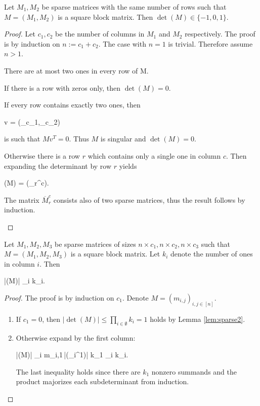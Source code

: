 \begin{lem}
\label{lem:sparse2}
Let $M_1,M_2$ be sparse matrices with the same number of rows such that $M = (M_1,M_2)$ is a square block matrix. Then $\det(M) \in \{-1,0,1\}$.
\end{lem}
\begin{proof}
Let $c_1,c_2$ be the number of columns in $M_1$ and $M_2$ respectively. The proof is by induction on $n := c_1+c_2$. The case with $n=1$ is trivial. Therefore assume $n>1$.

There are at most two ones in every row of M.
\begin{cosyitemize}
	\item If there is a row with zeros only, then $\det(M) = 0$.
	\item If every row contains exactly two ones, then
		\begin{cosyeqnarray}
			v = (_{c_1},_{c_2}) \nonumber
		\end{cosyeqnarray}%
		is such that $Mv^T = 0$. Thus $M$ is singular and $\det(M) = 0$.
	\item Otherwise there is a row $r$ which contains only a single one in column $c$. Then expanding the determinant by row $r$ yields
	 \begin{cosyeqnarray}
	 	\det(M) = \pm \det(_r^c).
	 \end{cosyeqnarray}%
	The matrix $\overbar{M}_r^c$ consists also of two sparse matrices, thus the result follows by induction.
\end{cosyitemize}
\end{proof}

\begin{lem}
\label{lem:sparse3}
Let $M_1,M_2,M_3$ be sparse matrices of sizes $n \times c_1, n \times c_2, n \times c_3$ such that $M = (M_1,M_2,M_3)$ is a square block matrix. Let $k_i$ denote the number of ones in column $i$. Then
\begin{cosyeqnarray}
	|\det(M)| \leq \prod_{i \in [c_1]} k_i.
\end{cosyeqnarray}%
\end{lem}
\begin{proof}
The proof is by induction on $c_1$. Denote $M = (m_{i,j})_{i,j \in[n]}$.
\begin{enumerate}
	\item If $c_1 = 0$, then $|\det(M)| \leq \prod_{i\in\emptyset} k_i = 1$ holds by Lemma \ref{lem:sparse2}.
	\item Otherwise expand by the first column:
	\begin{cosyeqnarray}
		|\det(M)| \leq \sum_{i\in[n]} m_{i,1}\,|\det(_i^1)| \leq k_1 \prod_{i \in [2, c_1]} k_i.
	\end{cosyeqnarray}%
	The last inequality holds since there are $k_1$ nonzero summands and the product majorizes each subdeterminant from induction.
\end{enumerate}
\end{proof}

